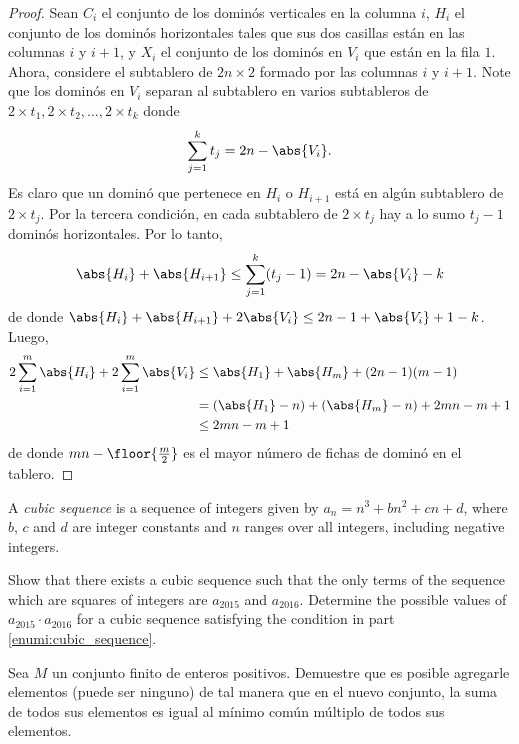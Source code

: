 \begin{proof}
	Sean $C_i$ el conjunto de los dominós verticales en la columna $i$, $H_i$ el conjunto de los dominós horizontales tales que sus dos casillas están en las columnas $i$ y $i+1$, y $X_i$ el conjunto de los dominós en $V_i$ que están en la fila $1$. Ahora, considere el subtablero de $2n\times 2$ formado por las columnas $i$ y $i+1$. Note que los dominós en $V_i$ separan al subtablero en varios subtableros de $2\times t_1,2\times t_2,\dots,2\times t_k$ donde
	\[\sum_{j=1}^k t_j=2n-\abs{V_i}.\]
	Es claro que un dominó que pertenece en $H_i$ o $H_{i+1}$ está en algún subtablero de $2\times t_j$. Por la tercera condición, en cada subtablero de $2\times t_j$ hay a lo sumo $t_j-1$ dominós horizontales. Por lo tanto,
	\[\abs{H_i}+\abs{H_{i+1}}\le\sum_{j=1}^k(t_j-1)=2n-\abs{V_i}-k\]
	de donde $\abs{H_i}+\abs{H_{i+1}}+2\abs{V_i}\le 2n-1+\abs{V_i}+1-k$. Luego,
	\begin{align*}
		2\sum_{i=1}^m\abs{H_i}+2\sum_{i=1}^m\abs{V_i}
		&\le\abs{H_1}+\abs{H_m}+(2n-1)(m-1)\\
		&=(\abs{H_1}-n)+(\abs{H_m}-n)+2mn-m+1\\
		&\le 2mn-m+1
	\end{align*}
	de donde $mn-\floor{\frac{m}{2}}$ es el mayor número de fichas de dominó en el tablero.
\end{proof}

\begin{problem}[RMM 2016/3]
	A \emph{cubic sequence} is a sequence of integers given by $a_n=n^3+bn^2+cn+d$, where $b$, $c$ and $d$ are integer constants and $n$ ranges over all integers, including negative integers.
	\begin{enumerate}[(a)]
		\ii \label{enumi:cubic_sequence} Show that there exists a cubic sequence such that the only terms of the sequence which are squares of integers are $a_{2015}$ and $a_{2016}$.
		\ii Determine the possible values of $a_{2015}\cdot a_{2016}$ for a cubic sequence satisfying the condition in part \ref{enumi:cubic_sequence}.
	\end{enumerate}
\end{problem}

\begin{probMG}
	Sea $M$ un conjunto finito de enteros positivos. Demuestre que es posible agregarle elementos (puede ser ninguno) de tal manera que en el nuevo conjunto, la suma de todos sus elementos es igual al mínimo común múltiplo de todos sus elementos.
\end{probMG}

